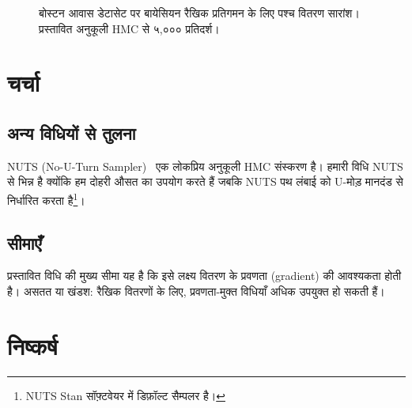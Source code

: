 \documentclass[12pt,a4paper]{article}
\theoremstyle{plain}
\theoremstyle{definition}
\theoremstyle{remark}
\begin{document}
\begin{figure}[ht]
\centering
{}
\caption{बोस्टन आवास डेटासेट पर बायेसियन रैखिक प्रतिगमन के लिए
पश्च वितरण सारांश। प्रस्तावित अनुकूली HMC से ५,००० प्रतिदर्श।}
\label{fig:posterior}
\end{figure}

\section{चर्चा}
\label{sec:discussion}

\subsection{अन्य विधियों से तुलना}

NUTS (No-U-Turn Sampler)~\citep{hoffman2014} एक लोकप्रिय
अनुकूली HMC संस्करण है। हमारी विधि NUTS से भिन्न है क्योंकि
हम दोहरी औसत का उपयोग करते हैं जबकि NUTS पथ लंबाई को
U-मोड़ मानदंड से निर्धारित करता है\footnote{%
NUTS Stan सॉफ़्टवेयर में डिफ़ॉल्ट सैम्पलर है।}।

\subsection{सीमाएँ}

प्रस्तावित विधि की मुख्य सीमा यह है कि इसे लक्ष्य वितरण
के प्रवणता (gradient) की आवश्यकता होती है। असतत या
खंडश: रैखिक वितरणों के लिए, प्रवणता-मुक्त विधियाँ
अधिक उपयुक्त हो सकती हैं।

\section{निष्कर्ष}
\label{sec:conclusion}
\end{document}
